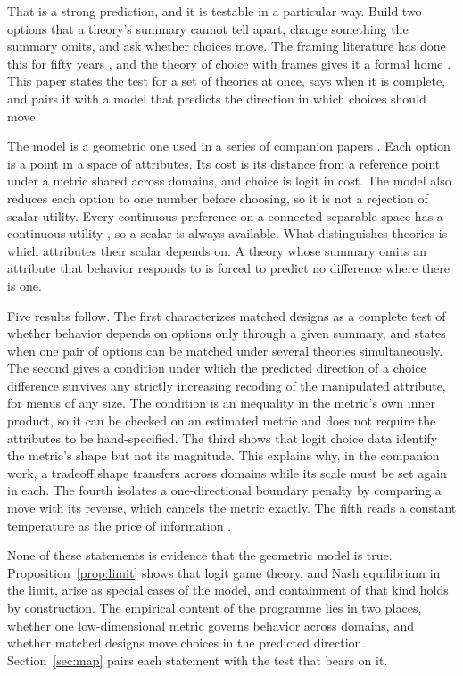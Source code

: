\documentclass[11pt]{article}
\theoremstyle{definition}
\begin{document}
That is a strong prediction, and it is testable in a particular way.
Build two options that a theory's summary cannot tell apart, change something the summary omits, and ask whether choices move.
The framing literature has done this for fifty years \citep{TverskyKahneman1981,TverskyKahneman1986}, and the theory of choice with frames gives it a formal home \citep{SalantRubinstein2008,BernheimRangel2009}.
This paper states the test for a set of theories at once, says when it is complete, and pairs it with a model that predicts the direction in which choices should move.

The model is a geometric one used in a series of companion papers \citep{BondPartI,BondPartII}.
Each option is a point in a space of attributes.
Its cost is its distance from a reference point under a metric shared across domains, and choice is logit in cost.
The model also reduces each option to one number before choosing, so it is not a rejection of scalar utility.
Every continuous preference on a connected separable space has a continuous utility \citep{Debreu1954}, so a scalar is always available.
What distinguishes theories is which attributes their scalar depends on.
A theory whose summary omits an attribute that behavior responds to is forced to predict no difference where there is one.

Five results follow.
The first characterizes matched designs as a complete test of whether behavior depends on options only through a given summary, and states when one pair of options can be matched under several theories simultaneously.
The second gives a condition under which the predicted direction of a choice difference survives any strictly increasing recoding of the manipulated attribute, for menus of any size.
The condition is an inequality in the metric's own inner product, so it can be checked on an estimated metric and does not require the attributes to be hand-specified.
The third shows that logit choice data identify the metric's shape but not its magnitude.
This explains why, in the companion work, a tradeoff shape transfers across domains while its scale must be set again in each.
The fourth isolates a one-directional boundary penalty by comparing a move with its reverse, which cancels the metric exactly.
The fifth reads a constant temperature as the price of information \citep{MatejkaMcKay2015}.

None of these statements is evidence that the geometric model is true.
Proposition~\ref{prop:limit} shows that logit game theory, and Nash equilibrium in the limit, arise as special cases of the model, and containment of that kind holds by construction.
The empirical content of the programme lies in two places, whether one low-dimensional metric governs behavior across domains, and whether matched designs move choices in the predicted direction.
Section~\ref{sec:map} pairs each statement with the test that bears on it.
\end{document}
